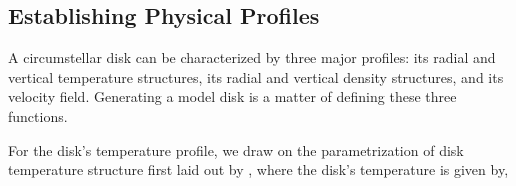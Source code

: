 \subsection{Establishing Physical Profiles}
A circumstellar disk can be characterized by three major profiles: its radial and vertical temperature structures, its radial and vertical density structures, and its velocity field. Generating a model disk is a matter of defining these three functions.







For the disk's temperature profile, we draw on the parametrization of disk temperature structure first laid out by \cite{Dartois2003}, where the disk's temperature is given by,


